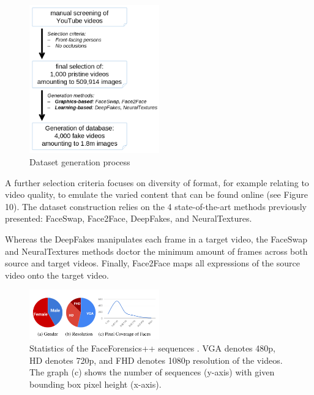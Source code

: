 \documentclass{article} %
\begin{document}
\begin{figure}[H]
\begin{center}
\includegraphics[width=0.5\textwidth]{images/process.png}
\end{center}
\caption{Dataset generation process}
\end{figure}

A further selection criteria focuses on diversity of format, for example relating to video quality, to emulate the varied content that can be found online (see Figure 10). The dataset construction relies on the 4 state-of-the-art methods previously presented: FaceSwap, Face2Face, DeepFakes, and NeuralTextures.

Whereas the DeepFakes manipulates each frame in a target video, the FaceSwap and NeuralTextures methods doctor the minimum amount of frames across both source and target videos. Finally, Face2Face maps all expressions of the source video onto the target video.

\begin{figure}[H]
\begin{center}
\includegraphics[width=0.5\textwidth]{images/stats.png}
\end{center}
\caption{Statistics of the FaceForensics++ sequences \citep{DBLP:journals/corr/abs-1803-09179}. VGA denotes 480p, HD denotes 720p, and FHD denotes 1080p resolution of the videos. The graph (c) shows the number of sequences (y-axis) with given bounding box pixel height (x-axis).}
\end{figure}
\end{document}
